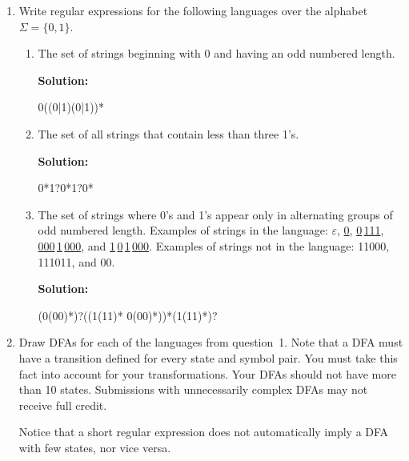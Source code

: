 \documentclass[11pt]{article}
\renewcommand{\epsilon}{\varepsilon}
\begin{document}
\begin{enumerate}
\item Write regular expressions for the following languages over the alphabet $\Sigma = \{0, 1\}$.
\begin{enumerate}
    \item The set of strings beginning with 0 and having an odd numbered length.

    \textbf{Solution:} 
        \begin{center}
            0((0|1)(0|1))*
        \end{center}

    \item The set of all strings that contain less than three 1's.

    \textbf{Solution:} 
        \begin{center}
            0*1?0*1?0*
        \end{center}

    \item The set of strings where 0's and 1's appear only in alternating groups of odd numbered length. Examples of strings in the language: $\epsilon$, \underline{0},  \underline{0}\,\underline{111}, \underline{000}\,\underline{1}\,\underline{000}, and \underline{1}\,\underline{0}\,\underline{1}\,\underline{000}. Examples of strings not in the language: 11000, 111011, and 00.

    \textbf{Solution:} 
        \begin{center}
            (0(00)*)?((1(11)* 0(00)*))*(1(11)*)?
        \end{center}
    
\end{enumerate}

\newpage

\item Draw DFAs for each of the languages from question~1. Note that a DFA must have a transition defined for every state and symbol pair. You must take this fact into account for your transformations. Your DFAs should not have more than 10 states. Submissions with unnecessarily complex DFAs may not receive full credit.

Notice that a short regular expression does not automatically imply a DFA with few states, nor vice versa.


\end{enumerate}
\end{document}
